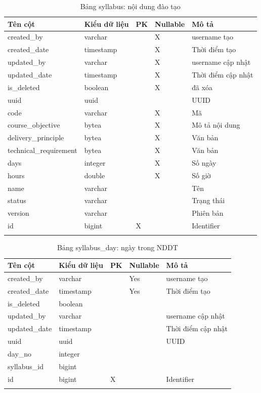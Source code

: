 \documentclass[report.tex]{subfiles}
\begin{document}
\begin{table}[!htb]
\begin{longtable}{|p{3cm}|p{3cm}|p{1cm}|p{1.6cm}|p{5cm}|}
\hline
\textbf{Tên cột} & \textbf{Kiểu dữ liệu} & \textbf{PK} & \textbf{Nullable} & \textbf{Mô tả} \\
\hline
created\_by & varchar & & X & username tạo \\
created\_date & timestamp & & X & Thời điểm tạo \\
updated\_by & varchar & & X & username cập nhật \\
updated\_date & timestamp & & X & Thời điểm cập nhật \\
is\_deleted & boolean & & X & đã xóa \\
uuid & uuid & & & UUID \\
code & varchar & & X & Mã \\
course\_objective & bytea & & X & Mô tả nội dung \\
delivery\_principle & bytea & & X & Văn bản \\
technical\_requirement & bytea & & X & Văn bản \\
days & integer & & X & Số ngày \\
hours & double & & X & Số giờ \\
name & varchar & & & Tên \\
status & varchar & & & Trạng thái \\
version & varchar & & & Phiên bản \\
id & bigint & X & & Identifier \\
\hline
\caption[Bảng syllabus]{Bảng syllabus: nội dung đào tạo}
\end{longtable}
\end{table}
\FloatBarrier

\begin{table}[!htb]
\begin{longtable}{|p{3cm}|p{3cm}|p{1cm}|p{1.6cm}|p{6cm}|}
\hline
\textbf{Tên cột} & \textbf{Kiểu dữ liệu} & \textbf{PK} & \textbf{Nullable} & \textbf{Mô tả} \\
\hline
created\_by & varchar & & Yes & username tạo \\
created\_date & timestamp & & Yes & Thời điểm tạo \\
is\_deleted & boolean & & & \\
updated\_by & varchar & & & username cập nhật \\
updated\_date & timestamp & & & Thời điểm cập nhật \\
uuid & uuid & & & UUID \\
day\_no & integer & & & \\
syllabus\_id & bigint & & & \\
id & bigint & X & & Identifier \\
\hline
\caption[Bảng syllabus\_day]{Bảng syllabus\_day: ngày trong NDDT}
\end{longtable}
\end{table}
\FloatBarrier
\end{document}
